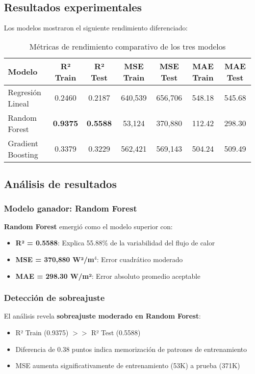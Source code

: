 \subsection{Resultados experimentales}
Los modelos mostraron el siguiente rendimiento diferenciado:

\begin{table}[h]
\hspace{-1cm}
\begin{tabular}{|l|c|c|c|c|c|c|}
\hline
\textbf{Modelo} & \textbf{R² Train} & \textbf{R² Test} & \textbf{MSE Train} & \textbf{MSE Test} & \textbf{MAE Train} & \textbf{MAE Test} \\
\hline
Regresión Lineal & 0.2460 & 0.2187 & 640,539 & 656,706 & 548.18 & 545.68 \\
Random Forest & \textbf{0.9375} & \textbf{0.5588} & 53,124 & 370,880 & 112.42 & 298.30 \\
Gradient Boosting & 0.3379 & 0.3229 & 562,421 & 569,143 & 504.24 & 509.49 \\
\hline
\end{tabular}
\caption{Métricas de rendimiento comparativo de los tres modelos}
\end{table}

\subsection{Análisis de resultados}

\subsubsection{Modelo ganador: Random Forest}
\textbf{Random Forest} emergió como el modelo superior con:
\begin{itemize}
    \item \textbf{R² = 0.5588}: Explica 55.88\% de la variabilidad del flujo de calor
    \item \textbf{MSE = 370,880 W²/m$^4$}: Error cuadrático moderado
    \item \textbf{MAE = 298.30 W/m²}: Error absoluto promedio aceptable
\end{itemize}

\subsubsection{Detección de sobreajuste}
El análisis revela \textbf{sobreajuste moderado en Random Forest}:
\begin{itemize}
    \item R² Train (0.9375) $>>$ R² Test (0.5588)
    \item Diferencia de 0.38 puntos indica memorización de patrones de entrenamiento
    \item MSE aumenta significativamente de entrenamiento (53K) a prueba (371K)
\end{itemize}

